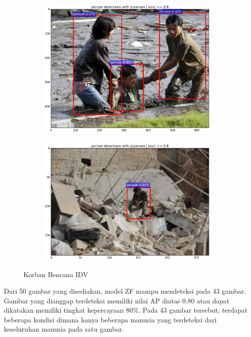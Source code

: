\begin{figure}[ht]
\begin{subfigure}[b]{0.3\textwidth}
    \includegraphics[width=\textwidth]{idv5}
  \end{subfigure}             
  \begin{subfigure}[b]{0.3\textwidth}
    \includegraphics[width=\textwidth]{idv6}
  \end{subfigure}
  \caption{Korban Bencana IDV}
  \label{fig:korban_bencana_idv}
\end{figure}

Dari 50 gambar yang disediakan, model ZF mampu mendeteksi pada 43 gambar. Gambar yang dianggap terdeteksi memiliki nilai AP diatas 0.80 atau dapat dikatakan memiliki tingkat kepercayaan $80\%$. Pada 43 gambar tersebut, terdapat beberapa kondisi dimana hanya beberapa manusia yang terdeteksi dari keseluruhan manusia pada satu gambar. 

